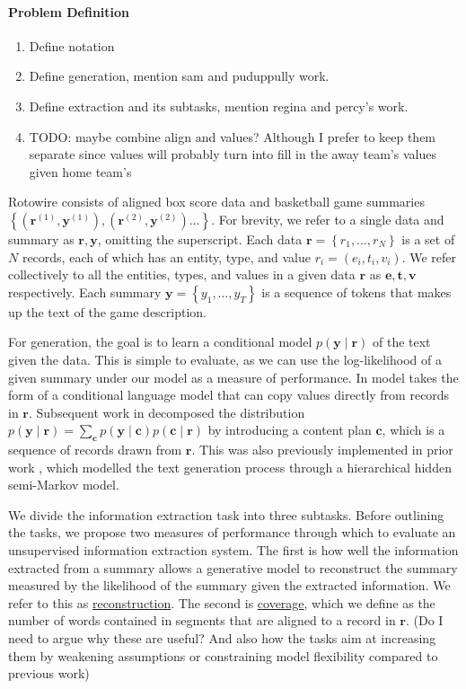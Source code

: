 \documentclass[11pt]{article}
\newcommand\set[1]{\left\{#1\right\}}
\newcommand{\bc}{\mathbf{c}}
\newcommand{\be}{\mathbf{e}}
\newcommand{\br}{\mathbf{r}}
\newcommand{\bt}{\mathbf{t}}
\newcommand{\bv}{\mathbf{v}}
\newcommand{\by}{\mathbf{y}}
\begin{document}
\paragraph{Problem Definition}
\begin{enumerate}
\item Define notation
\item Define generation, mention sam and puduppully work.
\item Define extraction and its subtasks, mention regina and percy's work.
\item TODO: maybe combine align and values? Although I prefer to keep them separate
since values will probably turn into fill in the away team's values given home team's
\end{enumerate}
Rotowire consists of aligned box score data and basketball game summaries
$\set{(\br^{(1)}, \by^{(1)}),(\br^{(2)},\by^{(2)})\ldots}$.
For brevity, we refer to a single data and summary as $\br,\by$, omitting the superscript.
Each data $\br = \set{r_1,\ldots,r_N}$ is a set of $N$ records, each of which has
an entity, type, and value $r_i = (e_i, t_i, v_i)$.
We refer collectively to all the entities, types, and values in a given data $\br$ as
$\be,\bt,\bv$ respectively.
Each summary $\by = \set{y_1,\ldots,y_T}$ is a sequence of tokens that makes up the
text of the game description.

For generation, the goal is to learn a conditional model $p(\by\mid\br)$ of the text given the data.
This is simple to evaluate, as we can use the log-likelihood of a given summary under our model
as a measure of performance.
In \citet{wiseman2017d2t} model takes the form of a conditional language model
that can copy values directly from records in $\br$.
Subsequent work in \citet{puduppully2018contentselection} decomposed the distribution 
$p(\by\mid\br) = \sum_{\bc}p(\by\mid\bc)p(\bc\mid\br)$
by introducing a content plan $\bc$, which is a sequence of records drawn from $\br$.
This was also previously implemented in prior work \citep{liang2009semalign},
which modelled the text generation process through a hierarchical hidden semi-Markov model.

We divide the information extraction task into three subtasks.
Before outlining the tasks, we propose two measures of performance through which
to evaluate an unsupervised information extraction system.
The first is how well the information extracted from a summary allows a 
generative model to reconstruct the summary measured by the likelihood
of the summary given the extracted information.
We refer to this as \underline{reconstruction}.
The second is \underline{coverage}, 
which we define as the number of words contained in segments
that are aligned to a record in $\br$.
(Do I need to argue why these are useful?
And also how the tasks aim at increasing them by weakening assumptions
or constraining model flexibility compared to previous work)
\end{document}
